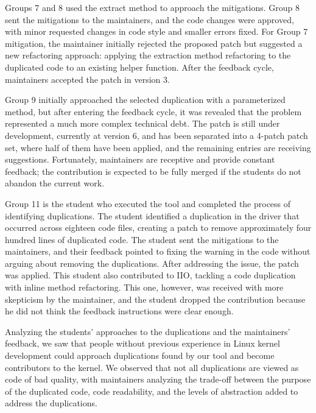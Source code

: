 \documentclass[10pt,conference]{IEEEtran}
\begin{document}
Groups 7 and 8 used the extract method to approach the mitigations. Group 8 sent the mitigations to the maintainers, and the code changes were approved, with minor requested changes in code style and smaller errors fixed. For Group 7 mitigation, the maintainer initially rejected the proposed patch but suggested a new refactoring approach: applying the extraction method refactoring to the duplicated code to an existing helper function. After the feedback cycle, maintainers accepted the patch in version 3.

Group 9 initially approached the selected duplication with a parameterized method, but after entering the feedback cycle, it was revealed that the problem represented a much more complex technical debt. The patch is still under development, currently at version 6, and has been separated into a 4-patch patch set, where half of them have been applied, and the remaining entries are receiving suggestions. Fortunately, maintainers are receptive and provide constant feedback; the contribution is expected to be fully merged if the students do not abandon the current work.

Group 11 is the student who executed the tool and completed the process of identifying duplications. The student identified a duplication in the driver that occurred across eighteen code files, creating a patch to remove approximately four hundred lines of duplicated code. The student sent the mitigations to the maintainers, and their feedback pointed to fixing the warning in the code without arguing about removing the duplications. After addressing the issue, the patch was applied. This student also contributed to IIO, tackling a code duplication with inline method refactoring. This one, however, was received with more skepticism by the maintainer, and the student dropped the contribution because he did not think the feedback instructions were clear enough.

Analyzing the students' approaches to the duplications and the maintainers' feedback, we saw that people without previous experience in Linux kernel development could approach duplications found by our tool and become contributors to the kernel. We observed that not all duplications 
are viewed as code of bad quality, with maintainers analyzing the trade-off between the purpose of the duplicated code, code readability, and the levels of abstraction added to address the duplications.

\end{document}
